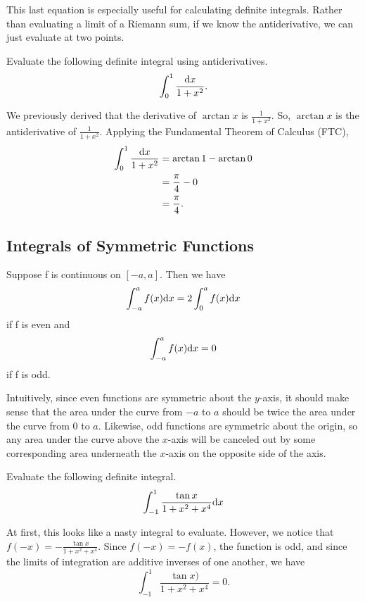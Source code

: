 This last equation is especially useful for calculating definite integrals.
Rather than evaluating a limit of a Riemann sum, if we know the antiderivative, we can just evaluate at two points.

\begin{example}
	Evaluate the following definite integral using antiderivatives.
	\begin{equation*}
		\int_{0}^{1}{\frac{\mathrm{d} x}{1+x^2}}.
	\end{equation*}
\end{example}
\begin{answer}
	We previously derived that the derivative of $\arctan{x}$ is $\frac{1}{1+x^2}$.
	So, $\arctan{x}$ is the antiderivative of $\frac{1}{1+x^2}$.
	Applying the Fundamental Theorem of Calculus (FTC),
	\begin{align*}
		\int_{0}^{1}{\frac{\mathrm{d} x}{1+x^2}} &= \arctan{1} - \arctan{0} \\
		&= \frac{\pi}{4} - 0 \\
		&= \frac{\pi}{4}.
	\end{align*} 
\end{answer}

\subsection{Integrals of Symmetric Functions}
Suppose f is continuous on $[-a, a]$. Then we have
\begin{equation*}
	\int_{-a}^{a}{f(x)\mathrm{d} x} = 2 \int_{0}^{a}{f(x)\mathrm{d} x}
\end{equation*}
if f is even and
\begin{equation*}
	\int_{-a}^{a}{f(x)\mathrm{d} x} = 0
\end{equation*}
if f is odd.\bigskip

\noindent
Intuitively, since even functions are symmetric about the $y$-axis, it should make sense that the area under the curve from $-a$ to $a$ should be twice the area under the curve from 0 to $a$. 
Likewise, odd functions are symmetric about the origin, so any area under the curve above the $x$-axis will be canceled out by some corresponding area underneath the $x$-axis on the opposite side of the axis.

\begin{example}
	Evaluate the following definite integral.
	\begin{equation*}
		\int_{-1}^{1}{\frac{\tan{x}}{1 + x^2 + x^4}\mathrm{d} x}
	\end{equation*}
\end{example}
\begin{answer}
	At first, this looks like a nasty integral to evaluate. 
	However, we notice that $f(-x) = -\frac{\tan{x}}{1 + x^2 + x^4}$.
	Since $f(-x) = -f(x)$, the function is odd, and since the limits of integration are additive inverses of one another, we have
	\begin{equation*}
		\int_{-1}^{1}{\frac{\tan{x})}{1 + x^2 + x^4}} = 0.
	\end{equation*}
\end{answer}